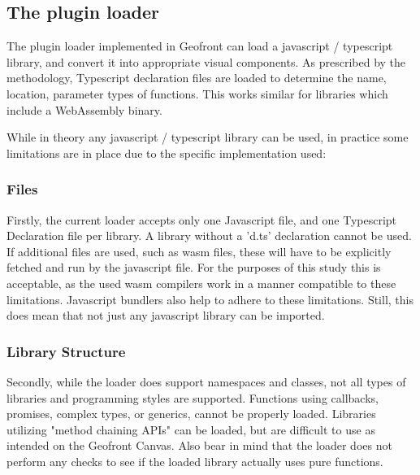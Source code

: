 \subsection{The plugin loader}
\label{sec:implementation:loading:limits}

The plugin loader implemented in Geofront can load a javascript / typescript library, and convert it into appropriate visual components. 
As prescribed by the methodology, Typescript declaration files are loaded to determine the name, location, parameter types of functions. 
This works similar for libraries which include a WebAssembly binary.

While in theory any javascript / typescript library can be used, in practice some limitations are in place due to the specific implementation used:

\subsubsection*{Files}
Firstly, the current loader accepts only one Javascript file, and one Typescript Declaration file per library.
A library without a 'd.ts' declaration cannot be used. 
If additional files are used, such as \ac{wasm} files, these will have to be explicitly fetched and run by the javascript file. 
For the purposes of this study this is acceptable, as the used \ac{wasm} compilers work in a manner compatible to these limitations.
Javascript bundlers also help to adhere to these limitations.
Still, this does mean that not just any javascript library can be imported. 

\subsubsection*{Library Structure}
Secondly, while the loader does support namespaces and classes, not all types of libraries and programming styles are supported. 
Functions using callbacks, promises, complex types, or generics, cannot be properly loaded. 
Libraries utilizing "method chaining APIs" can be loaded, but are difficult to use as intended on the Geofront Canvas.
Also bear in mind that the loader does not perform any checks to see if the loaded library actually uses pure functions. 


